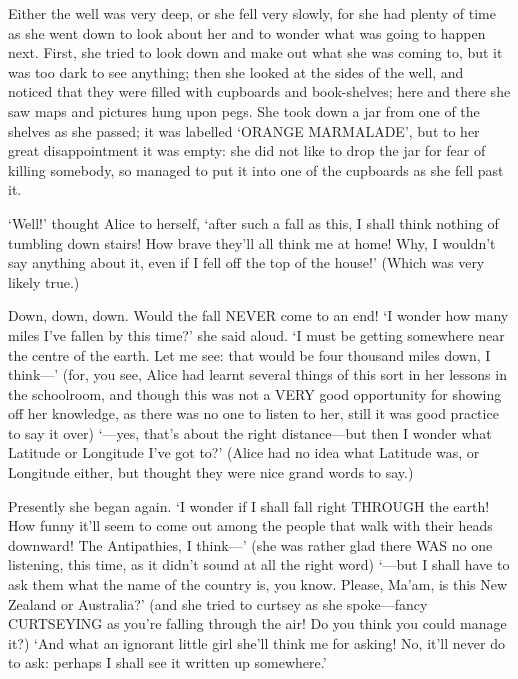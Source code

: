 \documentclass[12pt]{article}
\begin{document}
\begin{Parallel}[p]{}{}
{Either the well was very deep, or she fell very slowly, for she had plenty of time as she went down to look about her and to wonder what was going to happen next. First, she tried to look down and make out what she was coming to, but it was too dark to see anything; then she looked at the sides of the well, and noticed that they were filled with cupboards and book-shelves; here and there she saw maps and pictures hung upon pegs. She took down a jar from one of the shelves as she passed; it was labelled ‘ORANGE MARMALADE’, but to her great disappointment it was empty: she did not like to drop the jar for fear of killing somebody, so managed to put it into one of the cupboards as she fell past it.

‘Well!’ thought Alice to herself, ‘after such a fall as this, I shall think nothing of tumbling down stairs! How brave they’ll all think me at home! Why, I wouldn’t say anything about it, even if I fell off the top of the house!’ (Which was very likely true.)

Down, down, down. Would the fall NEVER come to an end! ‘I wonder how many miles I’ve fallen by this time?’ she said aloud. ‘I must be getting somewhere near the centre of the earth. Let me see: that would be four thousand miles down, I think—’ (for, you see, Alice had learnt several things of this sort in her lessons in the schoolroom, and though this was not a VERY good opportunity for showing off her knowledge, as there was no one to listen to her, still it was good practice to say it over) ‘—yes, that’s about the right distance—but then I wonder what Latitude or Longitude I’ve got to?’ (Alice had no idea what Latitude was, or Longitude either, but thought they were nice grand words to say.)

Presently she began again. ‘I wonder if I shall fall right THROUGH the earth! How funny it’ll seem to come out among the people that walk with their heads downward! The Antipathies, I think—’ (she was rather glad there WAS no one listening, this time, as it didn’t sound at all the right word) ‘—but I shall have to ask them what the name of the country is, you know. Please, Ma’am, is this New Zealand or Australia?’ (and she tried to curtsey as she spoke—fancy CURTSEYING as you’re falling through the air! Do you think you could manage it?) ‘And what an ignorant little girl she’ll think me for asking! No, it’ll never do to ask: perhaps I shall see it written up somewhere.’

}
\end{Parallel}
\end{document}
